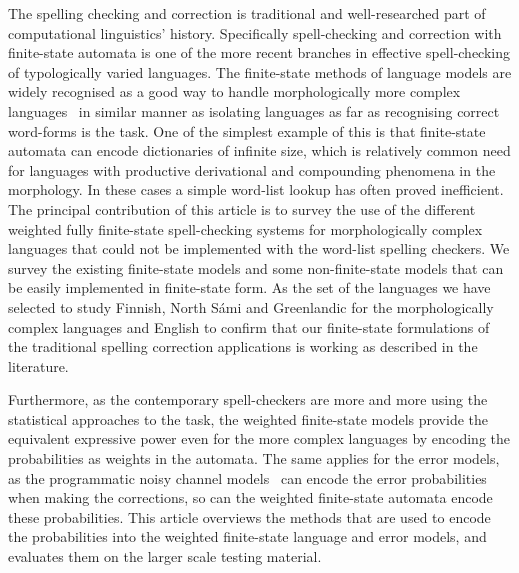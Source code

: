 \documentclass[a4paper,12pt]{article}
\begin{document}
The spelling checking and correction is traditional and well-researched part of
computational linguistics' history. Specifically spell-checking and correction
with finite-state automata is one of the more recent branches in effective
spell-checking of typologically varied languages. The finite-state methods of
language models are widely recognised as a good way to handle morphologically
more complex languages~\cite[]{beesley2003finite} in similar manner as
isolating languages as far as recognising correct word-forms is the task. One
of the simplest example of this is that finite-state automata can encode
dictionaries of infinite size, which is relatively common need for languages
with productive derivational and compounding phenomena in the morphology.  In
these cases a simple word-list lookup has often proved inefficient. The
principal contribution of this article is to survey the use of the different
weighted fully finite-state spell-checking systems for morphologically complex
languages that could not be implemented with the word-list spelling checkers.
We survey the existing finite-state models and some non-finite-state models
that can be easily implemented in finite-state form.  As the set of the
languages we have selected to study Finnish, North Sámi and Greenlandic for the
morphologically complex languages and English to confirm that our finite-state
formulations of the traditional spelling correction applications is working as
described in the literature.

Furthermore, as the contemporary spell-checkers are more and more using the
statistical approaches to the task, the weighted finite-state models provide
the equivalent expressive power even for the more complex languages by encoding
the probabilities as weights in the automata.  The same applies for the error
models, as the programmatic noisy channel models~\cite[]{brill2000improved} can
encode the error probabilities when making the corrections, so can the weighted
finite-state automata encode these probabilities. This article overviews the
methods that are used to encode the probabilities into the weighted
finite-state language and error models, and evaluates them on the larger scale
testing material.
\end{document}
